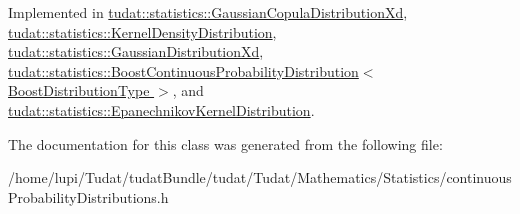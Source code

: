 Implemented in \hyperlink{classtudat_1_1statistics_1_1GaussianCopulaDistributionXd_afa1a343fc638373f6df65402327f2135}{tudat\+::statistics\+::\+Gaussian\+Copula\+Distribution\+Xd}, \hyperlink{classtudat_1_1statistics_1_1KernelDensityDistribution_ac8713330d605559df79f572175d9136c}{tudat\+::statistics\+::\+Kernel\+Density\+Distribution}, \hyperlink{classtudat_1_1statistics_1_1GaussianDistributionXd_a8b09ee64c8fe4ddb15bdba86b9eb5a5a}{tudat\+::statistics\+::\+Gaussian\+Distribution\+Xd}, \hyperlink{classtudat_1_1statistics_1_1BoostContinuousProbabilityDistribution_a4ca43440bd33baebea62c568f0fb5df4}{tudat\+::statistics\+::\+Boost\+Continuous\+Probability\+Distribution$<$ Boost\+Distribution\+Type $>$}, and \hyperlink{classtudat_1_1statistics_1_1EpanechnikovKernelDistribution_ad4ef6494dd02a5efae26ffe69e1f8008}{tudat\+::statistics\+::\+Epanechnikov\+Kernel\+Distribution}.



The documentation for this class was generated from the following file\+:\begin{DoxyCompactItemize}
\item 
/home/lupi/\+Tudat/tudat\+Bundle/tudat/\+Tudat/\+Mathematics/\+Statistics/continuous\+Probability\+Distributions.\+h\end{DoxyCompactItemize}
